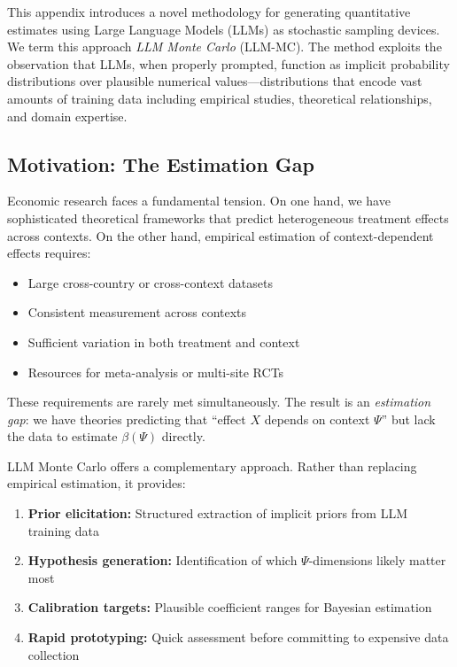 
This appendix introduces a novel methodology for generating quantitative estimates using Large Language Models (LLMs) as stochastic sampling devices. We term this approach \textit{LLM Monte Carlo} (LLM-MC). The method exploits the observation that LLMs, when properly prompted, function as implicit probability distributions over plausible numerical values---distributions that encode vast amounts of training data including empirical studies, theoretical relationships, and domain expertise.

\subsection{Motivation: The Estimation Gap}

Economic research faces a fundamental tension. On one hand, we have sophisticated theoretical frameworks that predict heterogeneous treatment effects across contexts. On the other hand, empirical estimation of context-dependent effects requires:
\begin{itemize}
    \item Large cross-country or cross-context datasets
    \item Consistent measurement across contexts
    \item Sufficient variation in both treatment and context
    \item Resources for meta-analysis or multi-site RCTs
\end{itemize}

These requirements are rarely met simultaneously. The result is an \textit{estimation gap}: we have theories predicting that ``effect $X$ depends on context $\Psi$'' but lack the data to estimate $\beta(\Psi)$ directly.

LLM Monte Carlo offers a complementary approach. Rather than replacing empirical estimation, it provides:
\begin{enumerate}
    \item \textbf{Prior elicitation:} Structured extraction of implicit priors from LLM training data
    \item \textbf{Hypothesis generation:} Identification of which $\Psi$-dimensions likely matter most
    \item \textbf{Calibration targets:} Plausible coefficient ranges for Bayesian estimation
    \item \textbf{Rapid prototyping:} Quick assessment before committing to expensive data collection
\end{enumerate}


